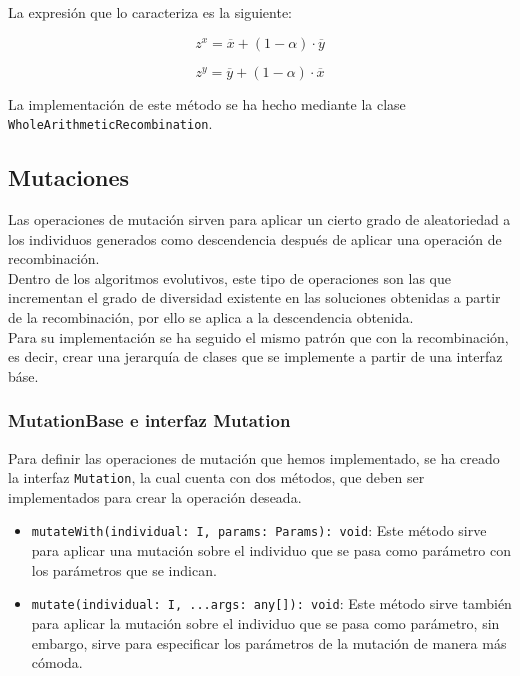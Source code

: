 La expresión que lo caracteriza es la siguiente:

\begin{equation}
    z^x = \overline{x} + (1 - \alpha) \cdot \overline{y}
\end{equation}

\begin{equation}
    z^y = \overline{y} + (1 - \alpha) \cdot \overline{x}
\end{equation}

La implementación de este método se ha hecho mediante la clase \texttt{WholeArithmeticRecombination}.

\subsection{Mutaciones}

Las operaciones de mutación sirven para aplicar un cierto grado de aleatoriedad a los individuos generados como descendencia después de aplicar una operación de recombinación. \\

Dentro de los algoritmos evolutivos, este tipo de operaciones son las que incrementan el grado de diversidad existente en las soluciones obtenidas a partir de la recombinación, por ello se aplica a la descendencia obtenida. \\

Para su implementación se ha seguido el mismo patrón que con la recombinación, es decir, crear una jerarquía de clases que se implemente a partir de una interfaz báse.

\subsubsection{MutationBase e interfaz Mutation}

Para definir las operaciones de mutación que hemos implementado, se ha creado la interfaz \texttt{Mutation}, la cual cuenta con dos métodos, que deben ser implementados para crear la operación deseada.

\begin{itemize}
    \item \texttt{mutateWith(individual: I, params: Params): void}: Este método sirve para aplicar una mutación sobre el individuo que se pasa como parámetro con los parámetros que se indican.
    \item \texttt{mutate(individual: I, ...args: any[]): void}: Este método sirve también para aplicar la mutación sobre el individuo que se pasa como parámetro, sin embargo, sirve para especificar los parámetros de la mutación de manera más cómoda.
\end{itemize}


